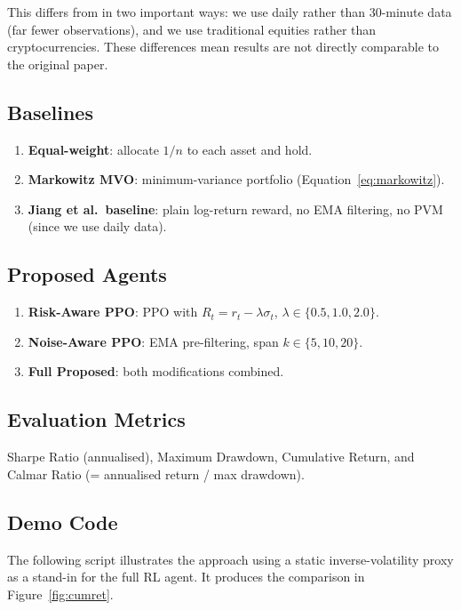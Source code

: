 \documentclass[12pt,a4paper]{article}
\begin{document}
This differs from \citet{jiang2017deep} in two important ways: we use
daily rather than 30-minute data (far fewer observations), and we use
traditional equities rather than cryptocurrencies. These differences
mean results are not directly comparable to the original paper.

\subsection{Baselines}

\begin{enumerate}[nosep]
  \item \textbf{Equal-weight}: allocate $1/n$ to each asset and hold.
  \item \textbf{Markowitz MVO}: minimum-variance portfolio
        (Equation~\ref{eq:markowitz}).
  \item \textbf{Jiang et al.\ baseline}: plain log-return reward,
        no EMA filtering, no PVM (since we use daily data).
\end{enumerate}

\subsection{Proposed Agents}

\begin{enumerate}[nosep]
  \item \textbf{Risk-Aware PPO}: PPO with
        $R_t = r_t - \lambda\sigma_t$, $\lambda \in \{0.5, 1.0, 2.0\}$.
  \item \textbf{Noise-Aware PPO}: EMA pre-filtering,
        span $k \in \{5, 10, 20\}$.
  \item \textbf{Full Proposed}: both modifications combined.
\end{enumerate}

\subsection{Evaluation Metrics}

Sharpe Ratio (annualised), Maximum Drawdown, Cumulative Return, and
Calmar Ratio (= annualised return / max drawdown).

\subsection{Demo Code}

The following script illustrates the approach using a static
inverse-volatility proxy as a stand-in for the full RL agent. It
produces the comparison in Figure~\ref{fig:cumret}.
\end{document}
